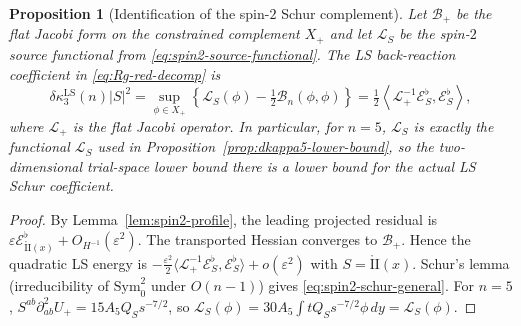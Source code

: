 \documentclass[11pt,reqno,a4paper]{amsart}
\numberwithin{equation}{section}
\theoremstyle{plain}
\newtheorem{proposition}[theorem]{Proposition}
\theoremstyle{remark}
\theoremstyle{plain}
\begin{document}
\begin{proposition}[Identification of the spin-$2$ Schur complement]
\label{prop:spin2-schur-identification}
Let $\mathcal B_+$ be the flat Jacobi form on the constrained complement
$X_+$ and let $\mathscr L_S$ be the spin-$2$ source functional from
\eqref{eq:spin2-source-functional}.  The LS back-reaction coefficient in
\eqref{eq:Rg-red-decomp} is
\begin{equation}\label{eq:spin2-schur-general}
\delta\kappa_3^{\mathrm{LS}}(n)|S|^2
=
\sup_{\phi\in X_+}
\left\{
\mathscr L_S(\phi)-\tfrac12\mathcal B_n(\phi,\phi)
\right\}
=
\tfrac12
\left\langle
\mathcal L_+^{-1}\mathcal E_S^\flat,
\mathcal E_S^\flat
\right\rangle,
\end{equation}
where $\mathcal L_+$ is the flat Jacobi operator.  In particular, for $n=5$,
$\mathscr L_S$ is exactly the functional $\mathcal L_S$ used in
Proposition~\ref{prop:dkappa5-lower-bound}, so the two-dimensional trial-space
lower bound there is a lower bound for the actual LS Schur coefficient.
\end{proposition}

\begin{proof}
By Lemma~\ref{lem:spin2-profile}, the leading projected residual is
$\varepsilon\mathcal E^\flat_{\mathring{\mathrm{II}}(x)}+O_{H^{-1}}(\varepsilon^2)$.
The transported Hessian converges to $\mathcal B_+$.
Hence the quadratic LS energy is
$-\frac{\varepsilon^2}{2}\langle\mathcal L_+^{-1}\mathcal E_S^\flat,
\mathcal E_S^\flat\rangle+o(\varepsilon^2)$
with $S=\mathring{\mathrm{II}}(x)$.  Schur's lemma (irreducibility of
$\mathrm{Sym}^2_0$ under $O(n-1)$) gives \eqref{eq:spin2-schur-general}.
For $n=5$, $S^{ab}\partial_{ab}^2U_+=15A_5Q_Ss^{-7/2}$, so
$\mathscr L_S(\phi)=30A_5\int t Q_S s^{-7/2}\phi\,dy=\mathcal L_S(\phi)$.
\end{proof}
\end{document}
